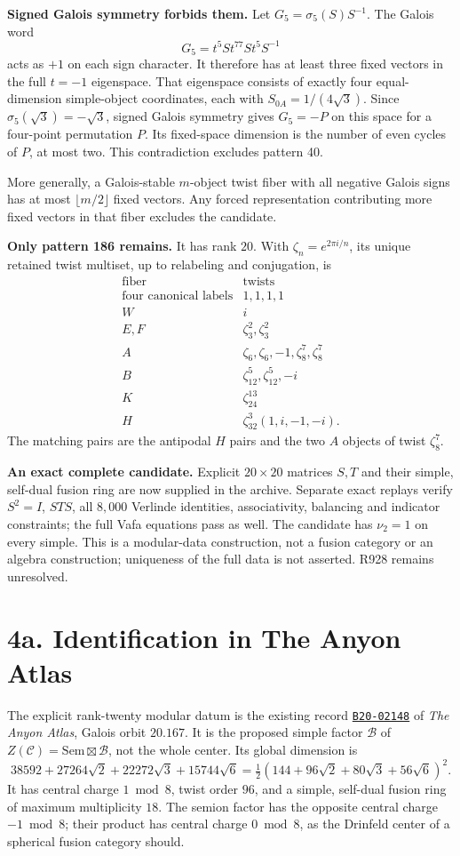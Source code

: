 \documentclass[11pt,a4paper]{article}
\newcommand{\z}{\zeta}
\begin{document}
\textbf{Signed Galois symmetry forbids them.} Let $G_5=\sigma_5(S)S^{-1}$. The Galois word
\[
G_5=t^5 S t^{77}S t^5 S^{-1}
\]
acts as $+1$ on each sign character. It therefore has at least three fixed vectors in the full $t=-1$ eigenspace. That eigenspace consists of exactly four equal-dimension simple-object coordinates, each with $S_{0A}=1/(4\sqrt3)$. Since $\sigma_5(\sqrt3)=-\sqrt3$, signed Galois symmetry gives $G_5=-P$ on this space for a four-point permutation $P$. Its fixed-space dimension is the number of even cycles of $P$, at most two. This contradiction excludes pattern 40.

More generally, a Galois-stable $m$-object twist fiber with all negative Galois signs has at most $\lfloor m/2\rfloor$ fixed vectors. Any forced representation contributing more fixed vectors in that fiber excludes the candidate.

\textbf{Only pattern 186 remains.} It has rank $20$. With $\z_n=e^{2\pi i/n}$, its unique retained twist multiset, up to relabeling and conjugation, is
\[
\begin{array}{c|l}
\text{fiber}&\text{twists}\\\hline
\text{four canonical labels}&1,1,1,1\\
W&i\\
E,F&\z_3^2,\z_3^2\\
A&\z_6,\z_6,-1,\z_8^7,\z_8^7\\
B&\z_{12}^{5},\z_{12}^{5},-i\\
K&\z_{24}^{13}\\
H&\z_{32}^3(1,i,-1,-i).
\end{array}
\]
The matching pairs are the antipodal $H$ pairs and the two $A$ objects of twist $\z_8^7$.

\textbf{An exact complete candidate.} Explicit $20\times20$ matrices $S,T$ and their simple, self-dual fusion ring are now supplied in the archive. Separate exact replays verify $S^2=I$, $STS$, all $8{,}000$ Verlinde identities, associativity, balancing and indicator constraints; the full Vafa equations pass as well. The candidate has $\nu_2=1$ on every simple. This is a modular-data construction, not a fusion category or an algebra construction; uniqueness of the full data is not asserted. R928 remains unresolved.



\newpage
\section*{4a. Identification in The Anyon Atlas}
The explicit rank-twenty modular datum is the existing record
\href{https://anyonatlas.org/data/B20-02148}{\texttt{B20-02148}}
of \emph{The Anyon Atlas}, Galois orbit $20.167$. It is the proposed
simple factor $\mathcal B$ of $Z(\mathcal C)=\mathrm{Sem}\boxtimes\mathcal B$,
not the whole center. Its global dimension is
\[
38592+27264\sqrt2+22272\sqrt3+15744\sqrt6
=\tfrac12(144+96\sqrt2+80\sqrt3+56\sqrt6)^2.
\]
It has central charge $1\bmod8$, twist order $96$, and a simple,
self-dual fusion ring of maximum multiplicity $18$.
The semion factor has the opposite central charge $-1\bmod8$; their
product has central charge $0\bmod8$, as the Drinfeld center of a
spherical fusion category should.
\end{document}
